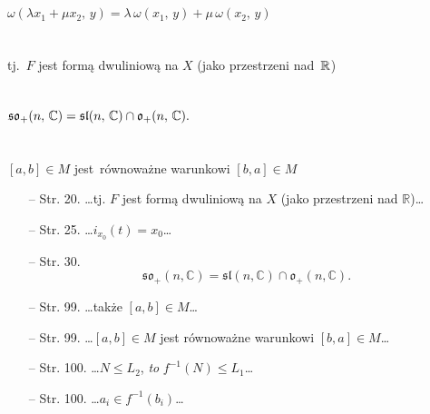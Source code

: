 \documentclass[a4paper,11pt]{article}
\begin{document}
\noindent
{} \\
\Jest \\
\Powin $\omega( \lambda x_{ 1 } + \mu x_{ 2 },\, y ) = \lambda \, \omega( x_{
  1 },\, y ) + \mu \, \omega( x_{ 2 },\, y )$ \\
 \\
\Jest \\
\Powin tj.~$F$ jest formą dwuliniową na $X$ (jako przestrzeni nad~$\mathbb{R}$) \\
 \\
\Jest \\
\Powin $\mathfrak{so}_{ + }( n,\, \mathbb{C} ) = \mathfrak{sl}( n,\, \mathbb{C} ) \cap
\mathfrak{o}_{ + }( n,\, \mathbb{C} ) \textrm{.}$ \\
 \\
\Jest \\
\Powin $[ a, b ] \in M$ jest~równoważne warunkowi $[ b, a ] \in M$ \\

\begin{itemize}
\item[--] Str. 20. \ldots tj. $F$ jest formą dwuliniową na $X$ (jako
  przestrzeni nad $\mathbb{R}$)\ldots
\item[--] Str. 25. \ldots$i_{ x_{ 0 } }( t ) = x_{ 0 }$\ldots
\item[--] Str. 30. $$\mathfrak{so}_{ + }( n, \mathbb{C} ) =
  \mathfrak{sl}( n, \mathbb{C} ) \cap \mathfrak{o}_{ + }( n,
  \mathbb{C} ) \textrm{.}$$
\item[--] Str. 99. \ldots także $[ a, b ] \in M$\ldots
\item[--] Str. 99. \ldots $[ a, b ] \in M$ jest równoważne warunkowi
  $[ b, a ] \in M$\ldots
\item[--] Str. 100. \ldots$N \leq L_{ 2 }$, \emph{to} $f^{ -1 }( N )
  \leq L_{ 1 }$\ldots
\item[--] Str. 100. \ldots$a_{ i } \in f^{ -1 }( b_{ i } )$\ldots
\end{itemize}


\vspace{\spaceTwo}












{}






\end{document}
